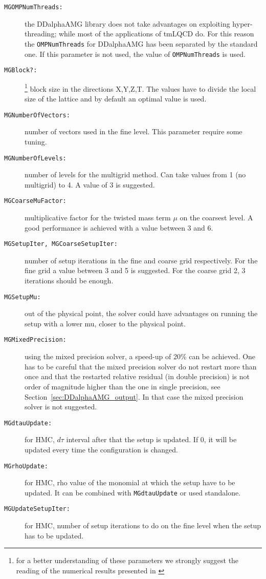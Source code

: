 \begin{description}
	\item[\texttt{MGOMPNumThreads:}] the DDalphaAMG library does not take advantages on exploiting hyper-threading; while most of the applications of tmLQCD do. For this reason the \texttt{OMPNumThreads} for DDalphaAMG has been separated by the standard one. If this parameter is not used, the value of \texttt{OMPNumThreads} is used.
	\item[\texttt{MGBlock?:}]\footnote{\label{fn:Alexandrou:2016} for a better understanding of these parameters we strongly suggest the reading of the numerical results presented in \cite{Alexandrou:2016}} block size in the directions X,Y,Z,T. The values have to divide the local size of the lattice and by default an optimal value is used.
	\item[\texttt{MGNumberOfVectors:}] number of vectors used in the fine level. This parameter require some tuning.
	\item[\texttt{MGNumberOfLevels:}] number of levels for the multigrid method. Can take values from 1 (no multigrid) to 4. A value of 3 is suggested.
	\item[\texttt{MGCoarseMuFactor:}] multiplicative factor for the twisted mass term $\mu$ on the coarsest level. A good performance is achieved with a value between 3 and 6.
	\item[\texttt{MGSetupIter, MGCoarseSetupIter:}] number of setup iterations in the fine and coarse grid respectively. For the fine grid a value between 3 and 5 is suggested. For the coarse grid 2, 3 iterations should be enough. 
	\item[\texttt{MGSetupMu:}] out of the physical point, the
          solver could have advantages on running the setup with a
          lower mu, closer to the physical point.
	\item[\texttt{MGMixedPrecision:}] using the mixed precision solver,
          a speed-up of 20\% can be achieved. One has to be careful
          that the mixed precision solver do not restart more than
          once and that the restarted relative residual (in double
          precision) is not order of magnitude higher than the one in single
          precision, see Section~\ref{sec:DDalphaAMG_output}. In that
          case the mixed precision solver is not suggested.
	\item[\texttt{MGdtauUpdate:}] for HMC, $d\tau$ interval after that the setup is updated. If 0, it will be updated every time the configuration is changed.
	\item[\texttt{MGrhoUpdate:}] for HMC, rho value of the monomial at which the setup have to be updated. It can be combined with \texttt{MGdtauUpdate} or used standalone.
	\item[\texttt{MGUpdateSetupIter:}] for HMC, number of setup iterations to do on the fine level when the setup has to be updated.
\end{description}
